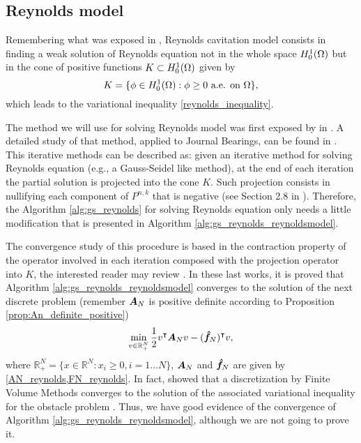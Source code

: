 \subsection{Reynolds model}
Remembering what was exposed in , Reynolds cavitation model consists in finding a weak solution of Reynolds equation not in the whole space ${H_0^1(\Omega)}$ but in the cone of positive functions $K\subset {H_0^1(\Omega)}$ given by
\begin{equation*}
K=\{\phi \in {H_0^1(\Omega)} :\phi \geq 0 \text{ a.e. on }\Omega\},
\end{equation*}
which leads to the variational inequality \eqref*{reynolds_inequality}.

The method we will use for solving Reynolds model was first exposed by \citeauthor{christopherson1941} in \citeyear{christopherson1941} \cite{christopherson1941}. A detailed study of that method, applied to Journal Bearings, can be found in \cite{cryer1971}. This iterative methods can be described as: given an iterative method for solving Reynolds equation (e.g., a Gauss-Seidel like method), at the end of each iteration the partial solution is projected into the cone $K$. Such projection consists in nullifying each component of $P^{n,k}$ that is negative (see Section 2.8 in \cite{glowinski1980}). Therefore, the Algorithm \ref{alg:gs_reynolds} for solving Reynolds equation only needs a little modification that is presented in Algorithm \ref{alg:gs_reynolds_reynoldsmodel}.

The convergence study of this procedure is based in the contraction property of the operator involved in each iteration composed with the projection operator into $K$, the interested reader may review \cite{cea1978,glowinski1980}. In these last works, it is proved that Algorithm \ref{alg:gs_reynolds_reynoldsmodel} converges to the solution of the next discrete problem (remember $\boldsymbol{A}_N$ is positive definite according to Proposition \ref{prop:An_definite_positive})
\begin{equation*}
\min_{v\in \mathbb{R}^N_+} \frac{1}{2} v^\intercal \boldsymbol{A}_Nv-(\boldsymbol{\hat{f}}_N)^\intercal v,
\end{equation*}
where $\mathbb{R}^N_+=\{x\in\mathbb{R}^{N}:x_i\geq 0,i=1\ldots N\}$, $\boldsymbol{A}_N$ and $\boldsymbol{\hat{f}}_N$ are given by \eqref{AN_reynolds,FN_reynolds}. In fact, \citeauthor{herbin2001} \cite{herbin2001} showed that a discretization by Finite Volume Methods converges to the solution of the associated variational inequality for the obstacle problem \cite{herbin2002}. Thus, we have good evidence of the convergence of Algorithm \ref{alg:gs_reynolds_reynoldsmodel}, although we are not going to prove it.

